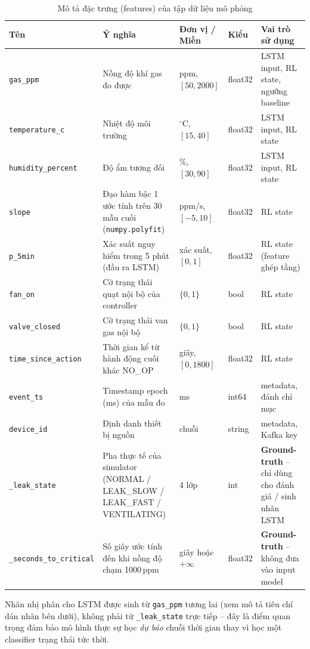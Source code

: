 \begin{table}[H]
\centering
\caption{Mô tả đặc trưng (features) của tập dữ liệu mô phỏng}
\label{tab:dataset_features}
\begin{tabular}{lp{3.6cm}p{2.4cm}p{1.6cm}p{3.4cm}}
\toprule
\textbf{Tên} & \textbf{Ý nghĩa} & \textbf{Đơn vị / Miền} & \textbf{Kiểu} & \textbf{Vai trò sử dụng} \\
\midrule
\texttt{gas\_ppm}        & Nồng độ khí gas đo được & ppm, $[50, 2000]$ & float32 & LSTM input, RL state, ngưỡng baseline \\
\texttt{temperature\_c}  & Nhiệt độ môi trường     & $^{\circ}$C, $[15, 40]$ & float32 & LSTM input, RL state \\
\texttt{humidity\_percent} & Độ ẩm tương đối       & \%, $[30, 90]$ & float32 & LSTM input, RL state \\
\texttt{slope}           & Đạo hàm bậc 1 ước tính trên 30 mẫu cuối (\texttt{numpy.polyfit}) & ppm/s, $[-5, 10]$ & float32 & RL state \\
\texttt{p\_5min}         & Xác suất nguy hiểm trong 5 phút (đầu ra LSTM) & xác suất, $[0,1]$ & float32 & RL state (feature ghép tầng) \\
\texttt{fan\_on}         & Cờ trạng thái quạt nội bộ của controller & $\{0,1\}$ & bool & RL state \\
\texttt{valve\_closed}   & Cờ trạng thái van gas nội bộ & $\{0,1\}$ & bool & RL state \\
\texttt{time\_since\_action} & Thời gian kể từ hành động cuối khác NO\_OP & giây, $[0, 1800]$ & float32 & RL state \\
\texttt{event\_ts}       & Timestamp epoch (ms) của mẫu đo & ms & int64 & metadata, đánh chỉ mục \\
\texttt{device\_id}      & Định danh thiết bị nguồn & chuỗi & string & metadata, Kafka key \\
\midrule
\texttt{\_leak\_state}   & Pha thực tế của simulator (NORMAL / LEAK\_SLOW / LEAK\_FAST / VENTILATING) & 4 lớp & int & \textbf{Ground-truth} -- chỉ dùng cho đánh giá / sinh nhãn LSTM \\
\texttt{\_seconds\_to\_critical} & Số giây ước tính đến khi nồng độ chạm 1000\,ppm & giây hoặc $+\infty$ & float32 & \textbf{Ground-truth} -- không đưa vào input model \\
\bottomrule
\end{tabular}
\end{table}

Nhãn nhị phân cho LSTM được sinh từ \texttt{gas\_ppm} tương lai (xem mô tả tiêu chí dán nhãn bên dưới), không phải từ \texttt{\_leak\_state} trực tiếp -- đây là điểm quan trọng đảm bảo mô hình thực sự học \emph{dự báo} chuỗi thời gian thay vì học một classifier trạng thái tức thời.

